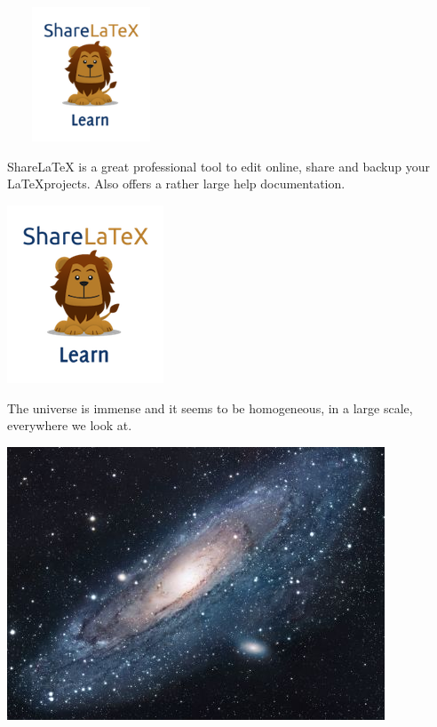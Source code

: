 \documentclass{article}
\begin{document}
\includegraphics[width=5cm, height=4cm]{lion-logo}

\vspace{1.5cm}

ShareLaTeX is a great professional tool to edit online, 
share and backup your \LaTeX projects. Also offers a 
rather large help documentation.

\includegraphics[scale=1.2, angle=45]{lion-logo}

\newpage

The universe is immense and it seems to be homogeneous, in a large scale, everywhere we look at.

\includegraphics[width=\textwidth]{universe}
\end{document}
